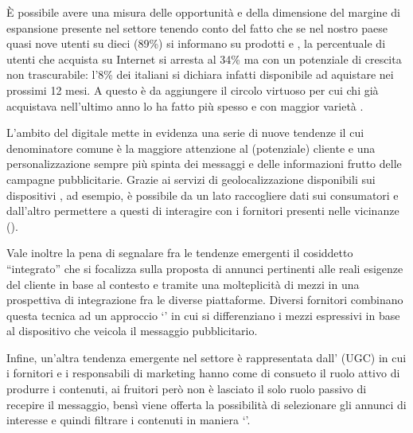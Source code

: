 È possibile avere una misura delle opportunità e della dimensione del margine di espansione presente nel settore tenendo conto del fatto che se nel nostro paese quasi nove utenti su dieci (89\%) si informano  su prodotti e , la percentuale di utenti che acquista su Internet si  arresta al 34\% ma con un potenziale di crescita non trascurabile: l'8\% dei  italiani si dichiara infatti disponibile ad aquistare  nei prossimi 12 mesi. A questo è da aggiungere il circolo virtuoso per
cui chi già acquistava nell’ultimo anno lo ha fatto più spesso e con maggior varietà \cite[\textit{pag.~3}]{contactlab:ecommerce}.

L'ambito del \mktg digitale mette in evidenza una serie di nuove tendenze il cui denominatore comune è la maggiore attenzione al (potenziale) cliente e una personalizzazione sempre più spinta dei messaggi e delle informazioni frutto delle campagne pubblicitarie. Grazie ai servizi di geolocalizzazione disponibili sui dispositivi , ad esempio, è possibile da un lato raccogliere dati sui consumatori e dall'altro permettere a questi di interagire con i fornitori presenti nelle vicinanze ().

Vale inoltre la pena di segnalare fra le tendenze emergenti il cosiddetto ``\mktg integrato'' che si focalizza sulla proposta di annunci pertinenti alle reali esigenze del cliente in base al contesto e tramite una molteplicità di mezzi in una prospettiva di integrazione fra le diverse piattaforme. Diversi fornitori combinano questa tecnica ad un approccio `' in cui si differenziano i mezzi espressivi in base al dispositivo che veicola il messaggio pubblicitario.

Infine, un'altra tendenza emergente nel settore è rappresentata dall' (UGC) in cui i fornitori e i responsabili di marketing hanno come di consueto il ruolo attivo di produrre i contenuti,  ai fruitori però non è lasciato il solo ruolo passivo di recepire il messaggio, bensì viene offerta la possibilità di selezionare gli annunci di interesse e quindi filtrare i contenuti in maniera `'.


